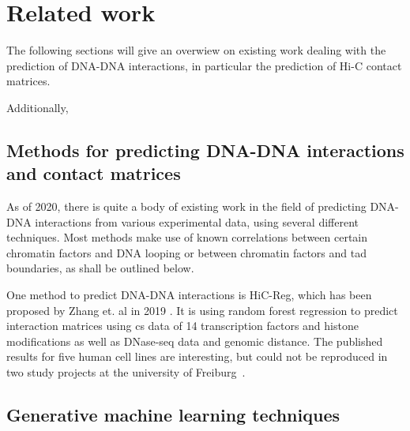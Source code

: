 \section{Related work}
The following sections will give an overwiew on existing work dealing with the prediction of 
DNA-DNA interactions, in particular the prediction of Hi-C contact matrices.

Additionally, 

\subsection{Methods for predicting DNA-DNA interactions and contact matrices}
As of 2020, there is quite a body of existing work in the field of predicting DNA-DNA interactions 
from various experimental data, using several different techniques. Most methods
make use of known correlations between certain chromatin factors and DNA looping or
between chromatin factors and \acrfull{tad} boundaries, as
shall be outlined below.

One method to predict DNA-DNA interactions is HiC-Reg, which has been proposed
by Zhang et. al in 2019 \cite{Zhang2019}. It is using random forest regression to predict interaction
matrices using \acrshort{cs} data of 14 transcription factors and histone modifications as well
as DNase-seq data and genomic distance. 
The published results for five human cell lines are interesting, but could not be reproduced in two study projects at the university of Freiburg~\cite{Krauth2020,Bajorat2019}.

\subsection{Generative machine learning techniques}
